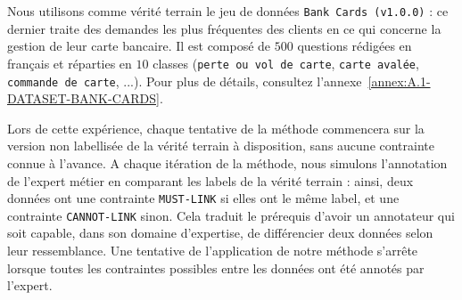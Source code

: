			Nous utilisons comme vérité terrain le jeu de données \texttt{Bank Cards (v1.0.0)} : ce dernier traite des demandes les plus fréquentes des clients en ce qui concerne la gestion de leur carte bancaire.
			Il est composé de $500$ questions rédigées en français et réparties en $10$ classes (\texttt{perte ou vol de carte}, \texttt{carte avalée}, \texttt{commande de carte}, ...).
			Pour plus de détails, consultez l'annexe~\ref{annex:A.1-DATASET-BANK-CARDS}.
			
			Lors de cette expérience, chaque tentative de la méthode commencera sur la version non labellisée de la vérité terrain à disposition, sans aucune contrainte connue à l'avance.
			A chaque itération de la méthode, nous simulons l'annotation de l'expert métier en comparant les labels de la vérité terrain : ainsi, deux données ont une contrainte \texttt{MUST-LINK} si elles ont le même label, et une contrainte \texttt{CANNOT-LINK} sinon.
			Cela traduit le prérequis d'avoir un annotateur qui soit capable, dans son domaine d'expertise, de différencier deux données selon leur ressemblance.
			Une tentative de l'application de notre méthode s'arrête lorsque toutes les contraintes possibles entre les données ont été annotés par l'expert.

